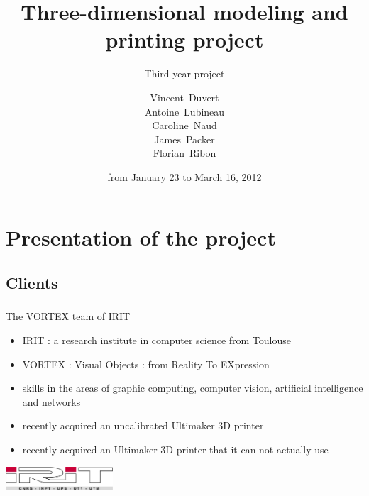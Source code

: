 \documentclass{beamer}
\title{Three-dimensional modeling and printing project}
\subtitle{Third-year project}
\author[V. Duvert, A. Lubineau, C. Naud, J. Packer, F. Ribon]{\scriptsize
Vincent~Duvert \\ Antoine~Lubineau \\ Caroline~Naud \\ James~Packer \\ Florian~Ribon}
\date{from January 23 to March 16, 2012}
\begin{document}
\frame{\titlepage}

\section{Presentation of the project}

\subsection{Clients}
\begin{frame}
	\frametitle{}
	
	\begin{block}{The \textsc{VORTEX} team of IRIT}
		\begin{itemize}
		\item \textsc{IRIT} : a research institute in computer science from Toulouse
		\item \textsc{VORTEX} : Visual Objects : from Reality To EXpression
		\item skills in the areas of graphic computing,  computer vision, artificial intelligence and networks
		\item recently acquired an uncalibrated Ultimaker 3D printer
		\item recently acquired an Ultimaker 3D printer that it can not actually use
		\end{itemize}
    \end{block}
    
    \begin{center}
		\includegraphics[width=4cm]{irit}
	\end{center}
    
\end{frame}
\end{document}
